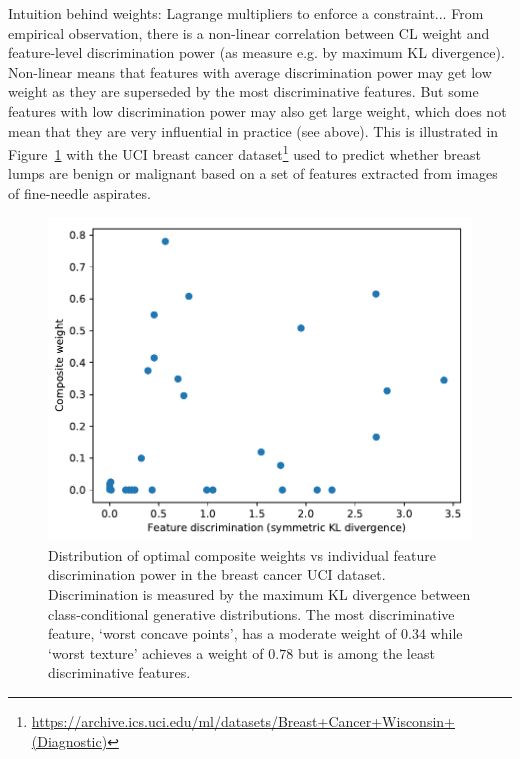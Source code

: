 \documentclass[english]{scrartcl}
\begin{document}


Intuition behind weights: Lagrange multipliers to enforce a constraint... From empirical observation, there is a non-linear correlation between CL weight and feature-level discrimination power (as measure e.g. by maximum KL divergence). Non-linear means that features with average discrimination power may get low weight as they are superseded by the most discriminative features. But some features with low discrimination power may also get large weight, which does not mean that they are very influential in practice (see above). This is illustrated in Figure~\ref{fig:disc_weight_plot} with the UCI breast cancer dataset\footnote{\url{https://archive.ics.uci.edu/ml/datasets/Breast+Cancer+Wisconsin+(Diagnostic)}} used to predict whether breast lumps are benign or malignant based on a set of features extracted from images of fine-needle aspirates. 

\begin{figure}[!ht]
  \begin{center}
    \includegraphics[width=.6\textwidth]{disc_weight_plot.pdf}
  \end{center}
\caption{Distribution of optimal composite weights vs individual feature discrimination power in the breast cancer UCI dataset. Discrimination is measured by the maximum KL divergence between class-conditional generative distributions. The most discriminative feature, `worst concave points', has a moderate weight of $0.34$ while `worst texture' achieves a weight of $0.78$ but is among the least discriminative features.}
\label{fig:disc_weight_plot}
\end{figure}
\end{document}

